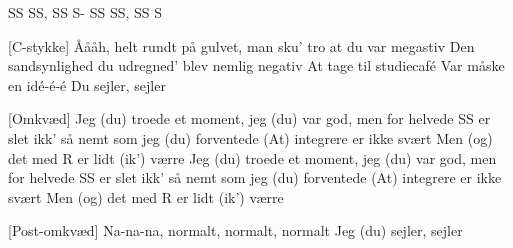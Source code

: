 \documentclass[a4paper,11pt]{article}
\begin{document}
\begin{song}
   SS SS, SS S-
SS SS, SS S

[C-stykke] Åååh, helt rundt på gulvet, man sku’ tro at du var megastiv
Den sandsynlighed du udregned’ blev nemlig negativ
At tage til studiecafé
Var måske en idé-é-é
Du sejler, sejler

[Omkvæd] Jeg (du) troede et moment, jeg (du) var god, men for helvede
SS er slet ikk’ så nemt som jeg (du) forventede
(At) integrere er ikke svært
Men (og) det med R er lidt (ik') værre
Jeg (du) troede et moment, jeg (du) var god, men for helvede
SS er slet ikk’ så nemt som jeg (du) forventede
(At) integrere er ikke svært
Men (og) det med R er lidt (ik') værre

[Post-omkvæd] Na-na-na, normalt, normalt, normalt
Jeg (du) sejler, sejler
  

  
\end{song}
\end{document}
